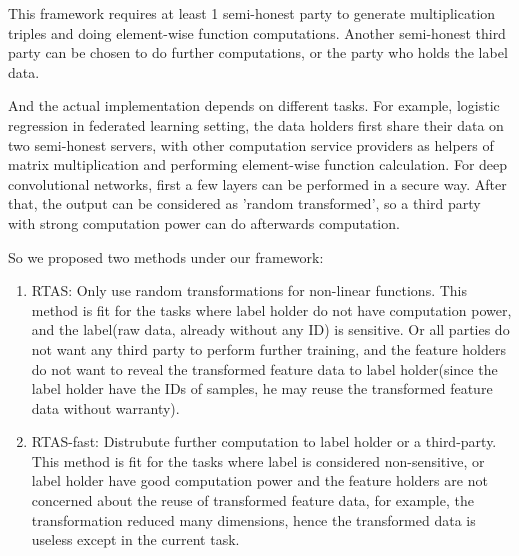 This framework requires at least 1 semi-honest party to generate multiplication triples and doing element-wise function computations. Another semi-honest third party can be chosen to do further computations, or the party who holds the label data.

And the actual implementation depends on different tasks. For example, logistic regression in federated learning setting, the data holders first share their data on two semi-honest servers, with other computation service providers as helpers of matrix multiplication and performing element-wise function calculation. For deep convolutional networks, first a few layers can be performed in a secure way. After that, the output can be considered as 'random transformed', so a third party with strong computation power can do afterwards computation.

So we proposed two methods under our framework:
\begin{enumerate}
    \item RTAS: Only use random transformations for non-linear functions. This method is fit for the tasks where label holder do not have computation power, and the label(raw data, already without any ID) is sensitive. Or all parties do not want any third party to perform further training, and the feature holders do not want to reveal the transformed feature data to label holder(since the label holder have the IDs of samples, he may reuse the transformed feature data without warranty).
    \item RTAS-fast: Distrubute further computation to label holder or a third-party. This method is fit for the tasks where label is considered non-sensitive, or label holder have good computation power and the feature holders are not concerned about the reuse of transformed feature data, for example, the transformation reduced many dimensions, hence the transformed data is useless except in the current task.
\end{enumerate}